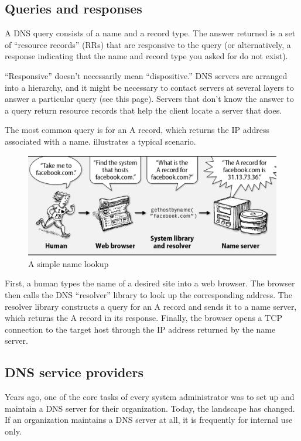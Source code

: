 \subsection{Queries and responses}
\label{sec:queries-and-responses}

A DNS query consists of a name and a record type.
The answer returned is a set of ``resource records'' (RRs) that are responsive to the query (or alternatively,
a response indicating that the name and record type you asked for do not exist).

``Responsive'' doesn't necessarily mean ``dispositive.'' DNS servers are
arranged into a hierarchy, and it might be necessary to contact servers
at several layers to answer a particular query (see this page).
Servers that don't know the answer to a query return resource records that help the client locate a server that does.

The most common query is for an A record, which returns the IP address associated with a name.
 illustrates a typical scenario.


\begin{figure}
   \centering
   \includegraphics[width=.7\textwidth]{images/00621.png}
   \caption{A simple name lookup}
   \label{fig:simple-name-lookup}
\end{figure}


First, a human types the name of a desired site into a web browser.
The browser then calls the DNS ``resolver'' library to look up the corresponding address.
The resolver library constructs a query for an A record and sends it to a name server, which returns the A record in its
response. Finally, the browser opens a TCP connection to the target host
through the IP address returned by the name server.


\subsection{DNS service providers}

Years ago, one of the core tasks of every system administrator was to set up and maintain a DNS server for their organization.
Today, the landscape has changed.
If an organization maintains a DNS server at all, it is frequently for internal use only.

